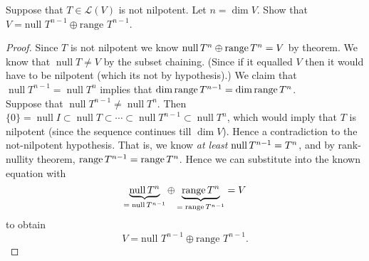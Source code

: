 Suppose that $T \in \mathcal{L}(V)$ is not nilpotent.  Let $n = \dim V$.  Show that \\ $V = \text{null }T^{n-1} \oplus \text{range }T^{n-1}$.

\begin{proof}
    Since $T$ is not nilpotent we know $\operatorname{null}T^n \oplus \operatorname{range}{T}^n = V$ by theorem. We know that $\operatorname{null}T \neq V$ by the subset chaining. (Since if it equalled $V$ then it would have to be nilpotent (which its not by hypothesis).) We claim that $\operatorname{null} T^{n-1} = \operatorname{null} T^n$ implies that $\dim \operatorname{range}{T}^{n-1} = \dim \operatorname{range}{T}^n$. \\Suppose that $\operatorname{null} T^{n-1} \neq \operatorname{null} T^n$. Then $\{0\} = \operatorname{null}I \subset \operatorname{null}T \subset \cdots \subset \operatorname{null} T^{n-1} \subset \operatorname{null}T^n$, which would imply that $T$ is nilpotent (since the sequence continues till $\dim V$). Hence a contradiction to the not-nilpotent hypothesis. That is, we know \textit{at least} $\operatorname{null} T^{n-1} = \null T^n$, and by rank-nullity theorem, $\operatorname{range}{T}^{n-1} = \operatorname{range}{T}^n$. Hence we can substitute into the known equation with 
    $$\underbrace{\operatorname{null}T^n}_{= \; \operatorname{null}T^{n-1}} \oplus \underbrace{\operatorname{range}{T}^n}_{= \; \operatorname{range}{T}^{n-1}} = V$$
    to obtain 
    $$V = \text{null }T^{n-1} \oplus \text{range }T^{n-1}.$$
\end{proof}